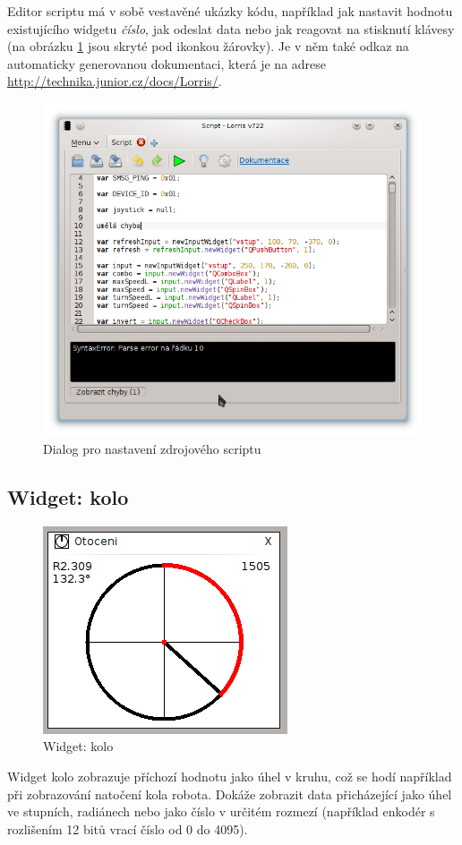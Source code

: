 \documentclass[12pt, a4paper, oneside]{article}
\newcommand{\It}{\textit}  %
\begin{document}
Editor scriptu má v sobě vestavěné ukázky kódu, například jak nastavit hodnotu existujícího widgetu \It{číslo}, jak odeslat data nebo jak reagovat na stisknutí klávesy (na obrázku \ref{script_src} jsou skryté pod ikonkou žárovky). Je v něm také odkaz na automaticky generovanou dokumentaci, která je na adrese \url{http://technika.junior.cz/docs/Lorris/}.
\begin{figure}[h]
\begin{center}
\includegraphics[width=\textwidth]{img/w_script_src.png}
\caption{Dialog pro nastavení zdrojového scriptu}
\label{script_src}
\end{center}
\end{figure}

\subsection{Widget: kolo}
\begin{figure}[H]
\begin{center}
\includegraphics[scale=0.8]{img/w_circle.png}
\caption{Widget: kolo}
\end{center}
\end{figure}
Widget kolo zobrazuje příchozí hodnotu jako úhel v kruhu, což se hodí například při zobrazování natočení kola robota. Dokáže zobrazit data přicházející jako úhel ve stupních, radiánech nebo jako číslo v určitém rozmezí (například enkodér s rozlišením 12 bitů vrací číslo od 0 do 4095).
\end{document}
